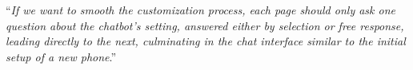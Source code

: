 ``\textit{If we want to smooth the customization process, each page should only ask one question about the chatbot's setting, answered either by selection or free response, leading directly to the next, culminating in the chat interface similar to the initial setup of a new phone}.'' 

